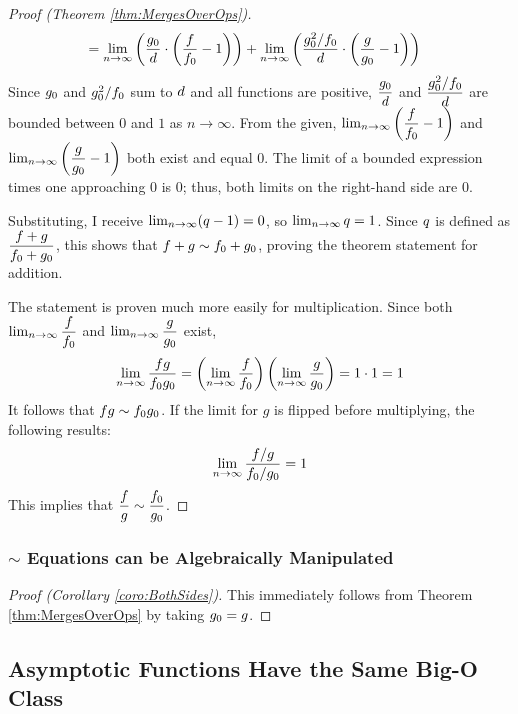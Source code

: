 \begin{proof}[Proof (Theorem \ref{thm:MergesOverOps})]
\begin{align*}
	&= \lim_{n \to \infty} \left( \frac{g_0}{d} \cdot \left( \frac{f}{f_0} - 1 \right) \right) + \lim_{n \to \infty} \left( \frac{g_0^2 / f_0}{d} \cdot \left( \frac{g}{g_0} - 1 \right) \right)
	\end{align*}
	Since $g_0$ and $g_0^2 / f_0$ sum to $d$ and all functions are positive, $\dfrac{g_0}{d}$ and $\dfrac{g_0^2 / f_0}{d}$ are bounded between $0$ and $1$ as $n \to \infty$. From the given, $\lim_{n \to \infty} \left( \dfrac{f}{f_0} - 1 \right)$ and $\lim_{n \to \infty} \left( \dfrac{g}{g_0} - 1 \right)$ both exist and equal $0$. The limit of a bounded expression times one approaching $0$ is $0$; thus, both limits on the right-hand side are $0$.
	
	Substituting, I receive $\lim_{n \to \infty} (q - 1) = 0$, so $\lim_{n \to \infty} q = 1$. Since $q$ is defined as $\dfrac{f + g}{f_0 + g_0}$, this shows that $f + g \sim f_0 + g_0$, proving the theorem statement for addition.
	
	The statement is proven much more easily for multiplication. Since both $\lim_{n \to \infty} \dfrac{f}{f_0}$ and $\lim_{n \to \infty} \dfrac{g}{g_0}$ exist,
	\begin{align*}
	\lim_{n \to \infty} \frac{fg}{f_0g_0} = \left( \lim_{n \to \infty} \frac{f}{f_0} \right) \left( \lim_{n \to \infty} \frac{g}{g_0} \right) = 1 \cdot 1 = 1
	\end{align*}
	It follows that $fg \sim f_0g_0$. If the limit for $g$ is flipped before multiplying, the following results:
	\begin{align*}
	\lim_{n \to \infty} \frac{f / g}{f_0 / g_0} = 1
	\end{align*}
	This implies that $\dfrac f g \sim \dfrac {f_0} {g_0}$.
\end{proof}

\subsubsection{$\sim$ Equations can be Algebraically Manipulated}

\begin{proof}[Proof (Corollary \ref{coro:BothSides})]
	This immediately follows from Theorem \ref{thm:MergesOverOps} by taking $g_0 = g$.
\end{proof}

\subsection{Asymptotic Functions Have the Same Big-O Class}

